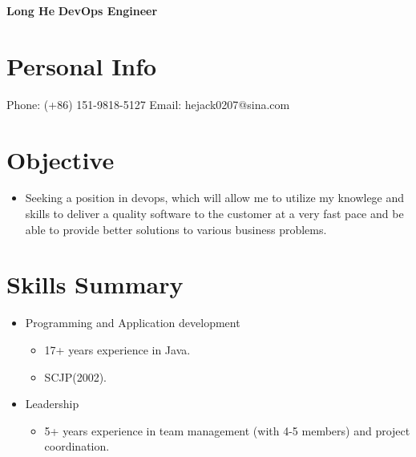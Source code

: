 \documentclass{resume}
\begin{document}

\textbf{Long He}\newline
\textbf{DevOps Engineer}\newline

\section{Personal Info}
Phone: (+86) 151-9818-5127\newline
Email: hejack0207@sina.com

\section{Objective}
\begin{itemize}
  \item Seeking a position in devops, which will allow me to utilize my knowlege and skills to deliver a quality software to the customer at a very fast pace and be able to provide better solutions to various business problems.
\end{itemize}

\section{Skills Summary}
\begin{itemize}
\item Programming and Application development
  \begin{itemize}
    \item 17+ years experience in Java.
    \item SCJP(2002).
  \end{itemize}
\item Leadership
  \begin{itemize}
    \item 5+ years experience in team management (with 4-5 members) and project coordination.
  \end{itemize}
\end{itemize}
\end{document}
